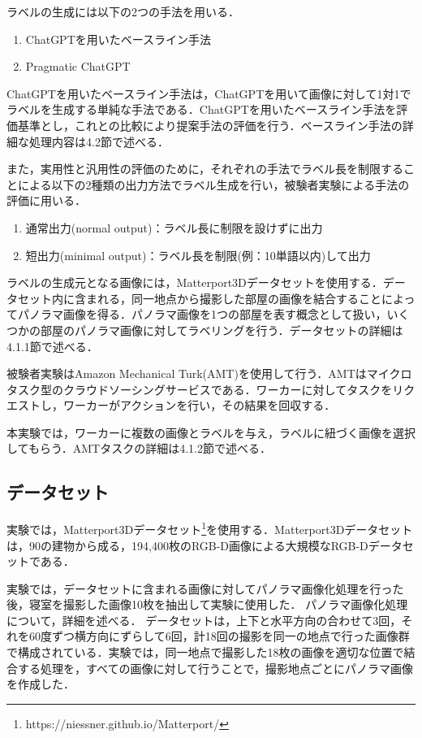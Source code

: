 \documentclass[a4paper,11pt]{jreport}
\begin{document}
ラベルの生成には以下の2つの手法を用いる．
\begin{enumerate}
    \item ChatGPTを用いたベースライン手法
    \item Pragmatic ChatGPT
\end{enumerate}

ChatGPTを用いたベースライン手法は，ChatGPTを用いて画像に対して1対1でラベルを生成する単純な手法である．ChatGPTを用いたベースライン手法を評価基準とし，これとの比較により提案手法の評価を行う．ベースライン手法の詳細な処理内容は4.2節で述べる．

また，実用性と汎用性の評価のために，それぞれの手法でラベル長を制限することによる以下の2種類の出力方法でラベル生成を行い，被験者実験による手法の評価に用いる．

\begin{enumerate}
    \item 通常出力(normal output)：ラベル長に制限を設けずに出力
    \item 短出力(minimal output)：ラベル長を制限(例：10単語以内)して出力
\end{enumerate}

ラベルの生成元となる画像には，Matterport3Dデータセットを使用する．データセット内に含まれる，同一地点から撮影した部屋の画像を結合することによってパノラマ画像を得る．パノラマ画像を1つの部屋を表す概念として扱い，いくつかの部屋のパノラマ画像に対してラベリングを行う．データセットの詳細は4.1.1節で述べる．

被験者実験はAmazon Mechanical Turk(AMT)を使用して行う．AMTはマイクロタスク型のクラウドソーシングサービスである．ワーカーに対してタスクをリクエストし，ワーカーがアクションを行い，その結果を回収する．

本実験では，ワーカーに複数の画像とラベルを与え，ラベルに紐づく画像を選択してもらう．AMTタスクの詳細は4.1.2節で述べる．

\subsection{データセット}

実験では，Matterport3Dデータセット\footnote{https://niessner.github.io/Matterport/}を使用する．Matterport3Dデータセットは，90の建物から成る，194,400枚のRGB-D画像による大規模なRGB-Dデータセットである．

実験では，データセットに含まれる画像に対してパノラマ画像化処理を行った後，寝室を撮影した画像10枚を抽出して実験に使用した．
パノラマ画像化処理について，詳細を述べる．
データセットは，上下と水平方向の合わせて3回，それを60度ずつ横方向にずらして6回，計18回の撮影を同一の地点で行った画像群で構成されている．実験では，同一地点で撮影した18枚の画像を適切な位置で結合する処理を，すべての画像に対して行うことで，撮影地点ごとにパノラマ画像を作成した．
\end{document}
